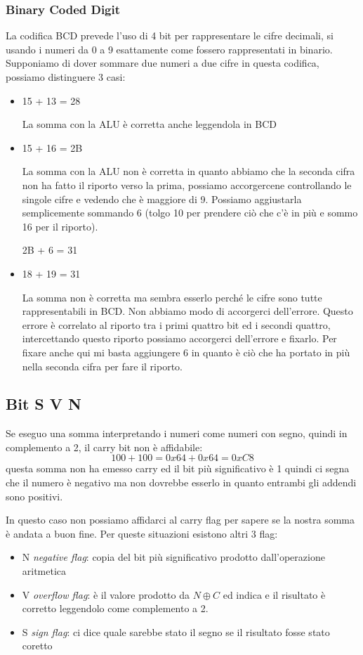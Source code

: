 \subsubsection{Binary Coded Digit}
La codifica BCD prevede l'uso di 4 bit per rappresentare le cifre decimali, si usando i numeri da 0 a 9 esattamente come fossero rappresentati in binario. Supponiamo di dover sommare due numeri a due cifre in questa codifica, possiamo distinguere 3 casi:
\begin{itemize}
    \item 15 + 13 = 28
    
    La somma con la ALU è corretta anche leggendola in BCD
    
    \item 15 + 16 = 2B
    
    La somma con la ALU non è corretta in quanto abbiamo che la seconda cifra non ha fatto il riporto verso la prima, possiamo accorgercene controllando le singole cifre e vedendo che è maggiore di 9. Possiamo aggiustarla semplicemente sommando 6 (tolgo 10 per prendere ciò che c'è in più e sommo 16 per il riporto).
    
    2B + 6 = 31

    \item 18 + 19 = 31
    
    La somma non è corretta ma sembra esserlo perché le cifre sono tutte rappresentabili in BCD.
    Non abbiamo modo di accorgerci dell'errore.
    Questo errore è correlato al riporto tra i primi quattro bit ed i secondi quattro, intercettando questo riporto possiamo accorgerci dell'errore e fixarlo.
    Per fixare anche qui mi basta aggiungere 6 in quanto è ciò che ha portato in più nella seconda cifra per fare il riporto.
\end{itemize}

\subsection{Bit S V N}
Se eseguo una somma interpretando i numeri come numeri con segno, quindi in complemento a 2, il carry bit non è affidabile:
$$ 100 + 100 = 0x64 + 0x64 = 0xC8 $$
questa somma non ha emesso carry ed il bit più significativo è 1 quindi ci segna che il numero è negativo ma non dovrebbe esserlo in quanto entrambi gli addendi sono positivi.

In questo caso non possiamo affidarci al carry flag per sapere se la nostra somma è andata a buon fine. Per queste situazioni esistono altri 3 flag:
\begin{itemize}
    \item N \emph{negative flag}: copia del bit più significativo prodotto dall'operazione aritmetica
    \item V \emph{overflow flag}: è il valore prodotto da $N \oplus C$ ed indica e il risultato è corretto leggendolo come complemento a 2.
    \item S \emph{sign flag}: ci dice quale sarebbe stato il segno se il risultato fosse stato coretto
\end{itemize}


